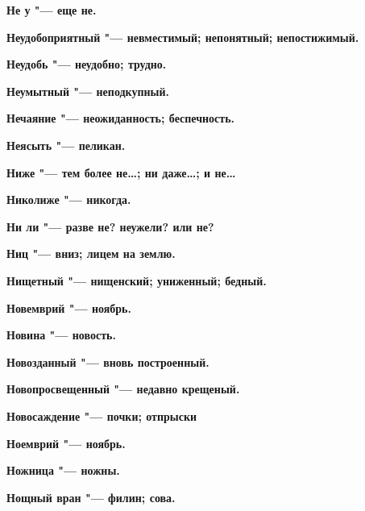 \begin{mymulticols}{2}
\bfseries Не у\normalfont{} "--- еще не. 




\bfseries Неудобоприятный\normalfont{} "--- невместимый; непонятный; непостижимый. 




\bfseries Неудобь\normalfont{} "--- неудобно; трудно. 




\bfseries Неумытный\normalfont{} "--- неподкупный. 




\bfseries Нечаяние\normalfont{} "--- неожиданность; беспечность. 




\bfseries Неясыть\normalfont{} "--- пеликан. 




\bfseries Ниже\normalfont{} "--- тем более не…; ни даже…; и не… 




\bfseries Николиже\normalfont{} "--- никогда. 




\bfseries Ни ли\normalfont{} "--- разве не? неужели? или не? 




\bfseries Ниц\normalfont{} "--- вниз; лицем на землю. 




\bfseries Нищетный\normalfont{} "--- нищенский; униженный; бедный. 




\bfseries Новемврий\normalfont{} "--- ноябрь. 




\bfseries Новина\normalfont{} "--- новость. 




\bfseries Новозданный\normalfont{} "--- вновь построенный. 




\bfseries Новопросвещенный\normalfont{} "--- недавно крещеный. 




\bfseries Новосаждение\normalfont{} "--- почки; отпрыски 




\bfseries Ноемврий\normalfont{} "--- ноябрь. 




\bfseries Ножница\normalfont{} "--- ножны. 




\bfseries Нощный вран\normalfont{} "--- филин; сова. 





\end{mymulticols}
